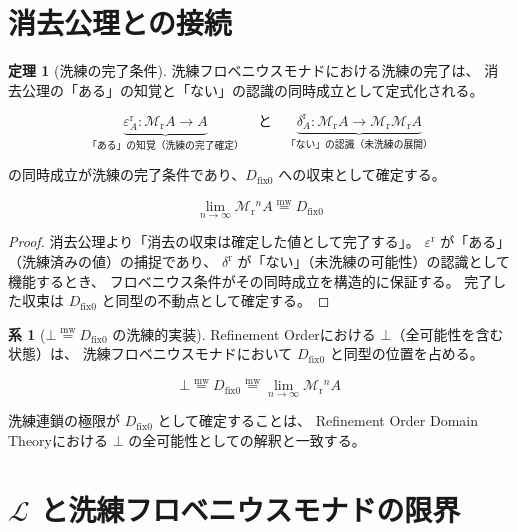 \documentclass[11pt,a4paper]{article}
\theoremstyle{definition}
\newtheorem{theorem}{定理}[section]
\newtheorem{corollary}{系}[section]
\newcommand{\mweq}{\mathrel{\overset{\mathrm{mw}}{=}}}
\newcommand{\dfix}{D_{\mathrm{fix}0}}
\newcommand{\Lhagma}{\mathcal{L}}
\newcommand{\Mr}{\mathcal{M}_{\mathrm{r}}}
\newcommand{\epsr}{\varepsilon^{\mathrm{r}}}
\newcommand{\deltar}{\delta^{\mathrm{r}}}
\begin{document}
\section{消去公理との接続}

\begin{theorem}[洗練の完了条件]
洗練フロベニウスモナドにおける洗練の完了は、
消去公理の「ある」の知覚と「ない」の認識の同時成立として定式化される。

\begin{equation}
\underbrace{\epsr_A : \Mr A \to A}_{\text{「ある」の知覚（洗練の完了確定）}}
\quad \text{と} \quad
\underbrace{\deltar_A : \Mr A \to \Mr\Mr A}_{\text{「ない」の認識（未洗練の展開）}}
\end{equation}

の同時成立が洗練の完了条件であり、$\dfix$ への収束として確定する。

\begin{equation}
\lim_{n \to \infty} \Mr{}^n A \mweq \dfix
\end{equation}
\end{theorem}

\begin{proof}
消去公理より「消去の収束は確定した値として完了する」。
$\epsr$ が「ある」（洗練済みの値）の捕捉であり、
$\deltar$ が「ない」（未洗練の可能性）の認識として機能するとき、
フロベニウス条件がその同時成立を構造的に保証する。
完了した収束は $\dfix$ と同型の不動点として確定する。
\end{proof}

\begin{corollary}[$\bot \mweq \dfix$ の洗練的実装]
Refinement Orderにおける $\bot$（全可能性を含む状態）は、
洗練フロベニウスモナドにおいて $\dfix$ と同型の位置を占める。

\begin{equation}
\bot \mweq \dfix \mweq \lim_{n \to \infty} \Mr{}^n A
\end{equation}

洗練連鎖の極限が $\dfix$ として確定することは、
Refinement Order Domain Theory\cite{Abramsky1991}における
$\bot$ の全可能性としての解釈と一致する。
\end{corollary}

\section{$\Lhagma$ と洗練フロベニウスモナドの限界}
\end{document}
